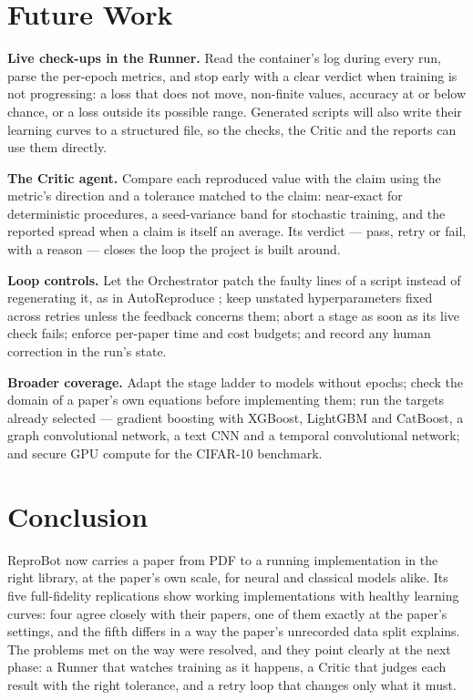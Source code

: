 \documentclass[10pt,twocolumn]{article}
\begin{document}
\section{Future Work}
\label{sec:future}

\textbf{Live check-ups in the Runner.} Read the container's log during every run, parse the
per-epoch metrics, and stop early with a clear verdict when training is not progressing: a loss
that does not move, non-finite values, accuracy at or below chance, or a loss outside its
possible range. Generated scripts will also write their learning curves to a structured file, so
the checks, the Critic and the reports can use them directly.

\textbf{The Critic agent.} Compare each reproduced value with the claim using the metric's
direction and a tolerance matched to the claim: near-exact for deterministic procedures, a
seed-variance band for stochastic training, and the reported spread when a claim is itself an
average. Its verdict --- pass, retry or fail, with a reason --- closes the loop the project is
built around.

\textbf{Loop controls.} Let the Orchestrator patch the faulty lines of a script instead of
regenerating it, as in AutoReproduce \cite{zhao2025autoreproduce}; keep unstated
hyperparameters fixed across retries unless the feedback concerns them; abort a stage as soon as
its live check fails; enforce per-paper time and cost budgets; and record any human correction
in the run's state.

\textbf{Broader coverage.} Adapt the stage ladder to models without epochs; check the domain of
a paper's own equations before implementing them; run the targets already selected --- gradient
boosting with XGBoost, LightGBM and CatBoost, a graph convolutional network, a text CNN and a
temporal convolutional network; and secure GPU compute for the CIFAR-10 benchmark.

\section{Conclusion}
\label{sec:conclusion}

ReproBot now carries a paper from PDF to a running implementation in the right library, at the
paper's own scale, for neural and classical models alike. Its five full-fidelity replications show working implementations with healthy learning curves: four agree closely with their papers, one of them exactly at the paper's settings, and the fifth differs in a way the paper's unrecorded data split explains. The problems met on
the way were resolved, and they point clearly at the next phase: a Runner that watches training
as it happens, a Critic that judges each result with the right tolerance, and a retry loop that
changes only what it must.
\end{document}
